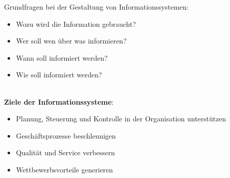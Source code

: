 \documentclass[a4]{scrartcl}
\begin{document}
Grundfragen bei der Gestaltung von Informationssystemen:
\begin{itemize}
    \item Wozu wird die Information gebraucht?
    \item Wer soll wen über was informieren?
    \item Wann soll informiert werden?
    \item Wie soll informiert werden?
\end{itemize}

\ \\
\textbf{Ziele der Informationssysteme}:
\begin{itemize}
    \item Planung, Steuerung und Kontrolle in der Organisation unterstützen
    \item Geschäftsprozesse beschleunigen
    \item Qualität und Service verbessern
    \item Wettbewerbsvorteile generieren
\end{itemize}
\end{document}
